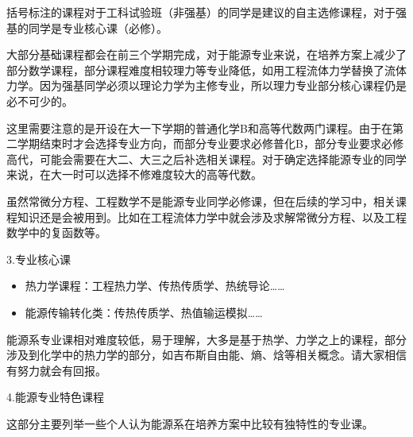 \documentclass[11pt,oneside]{book}
\begin{document}
括号标注的课程对于工科试验班（非强基）的同学是建议的自主选修课程，对于强基的同学是专业核心课（必修）。

\vspace{10pt}

大部分基础课程都会在前三个学期完成，对于能源专业来说，在培养方案上减少了部分数学课程，部分课程难度相较理力等专业降低，如用工程流体力学替换了流体力学。因为强基同学必须以理论力学为主修专业，所以理力专业部分核心课程仍是必不可少的。

\vspace{10pt}

这里需要注意的是开设在大一下学期的普通化学B和高等代数两门课程。由于在第二学期结束时才会选择专业方向，而部分专业要求必修普化B，部分专业要求必修高代，可能会需要在大二、大三之后补选相关课程。对于确定选择能源专业的同学来说，在大一时可以选择不修难度较大的高等代数。

\vspace{10pt}

虽然常微分方程、工程数学不是能源专业同学必修课，但在后续的学习中，相关课程知识还是会被用到。比如在工程流体力学中就会涉及求解常微分方程、以及工程数学中的复函数等。

\vspace{10pt}

3.专业核心课
\begin{itemize}
	\item 热力学课程：工程热力学、传热传质学、热统导论……
	
	\item 能源传输转化类：传热传质学、热值输运模拟……
	
\end{itemize}


能源系专业课相对难度较低，易于理解，大多是基于热学、力学之上的课程，部分涉及到化学中的热力学的部分，如吉布斯自由能、熵、焓等相关概念。请大家相信有努力就会有回报。

\vspace{10pt}

4.能源专业特色课程

这部分主要列举一些个人认为能源系在培养方案中比较有独特性的专业课。
\end{document}
